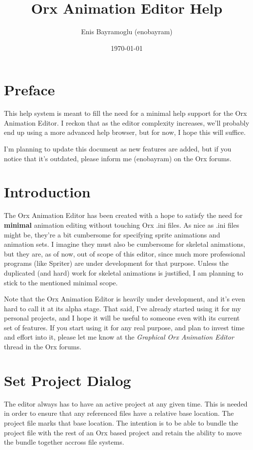 \documentclass{article}
\title{Orx Animation Editor Help}
\author{Enis Bayramoglu (enobayram)}
\date{\today}
\begin{document}
\maketitle
\tableofcontents

\section{Preface}
This help system is meant to fill the need for a minimal help support for the Orx Animation Editor. I reckon that as the editor complexity increases,
we'll probably end up using a more advanced help browser, but for now, I hope this will suffice.

I'm planning to update this document as new features are added, but if you notice that it's outdated, please inform me (enobayram) on the Orx forums.

\section{Introduction}
The Orx Animation Editor has been created with a hope to satisfy the need for \textbf{minimal} animation editing without touching Orx .ini files. As nice as
.ini files might be, they're a bit cumbersome for specifying sprite animations and animation sets. I imagine they must also be cumbersome for skeletal
animations, but they are, as of now, out of scope of this editor, since much more professional programs (like Spriter) are under development for that purpose. Unless the duplicated (and hard) work for skeletal animations is justified, I am planning to stick to the mentioned minimal scope.

Note that the Orx Animation Editor is heavily under development, and it's even hard to call it at its alpha stage. That said, I've already started using it for
my personal projects, and I hope it will be useful to someone even with its current set of features. If you start using it for any real purpose, and plan to invest
time and effort into it, please let me know at the \textit{Graphical Orx Animation Editor} thread in the Orx forums.

\section{Set Project Dialog}
The editor always has to have an active project at any given time. This is needed in order to ensure that any referenced files have a relative base location. The project
file marks that base location. The intention is to be able to bundle the project file with the rest of an Orx based project and retain the ability to move the bundle together accross file systems.
\end{document}
